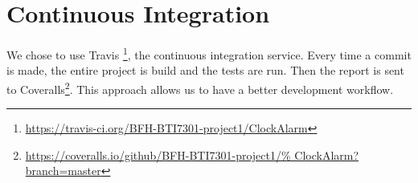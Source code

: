 \section{Continuous Integration}

We chose to use Travis
\footnote{\url{https://travis-ci.org/BFH-BTI7301-project1/ClockAlarm}}, the
continuous integration service. Every time a commit is made, the entire project
is build and the tests are run. Then the report is sent to
Coveralls\footnote{\url{https://coveralls.io/github/BFH-BTI7301-project1/%
ClockAlarm?branch=master}}. This approach allows us to have a better
development workflow.
